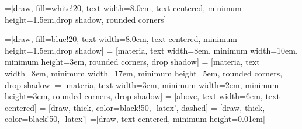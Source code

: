 =[draw, fill=white!20, text width=8.0em, text centered,
  minimum height=1.5em,drop shadow, rounded corners]

=[draw, fill=blue!20, text width=8.0em, text centered,
  minimum height=1.5em,drop shadow]
 = [materia, text width=8em, minimum width=10em,
  minimum height=3em, rounded corners, drop shadow]
 = [materia, text width=8em, minimum width=17em,
  minimum height=5em, rounded corners, drop shadow]
 = [materia, text width=3em, minimum width=2em, 
  minimum height=3em, rounded corners, drop shadow]
 = [above, text width=6em, text centered]
 = [draw, thick, color=black!50, -latex', dashed]
 = [draw, thick, color=black!50, -latex']
=[draw, text centered, minimum height=0.01em]
 
\newcommand{\blockdist}{1.3}
\newcommand{\edgedist}{1.5}

\newcommand{\block}[2]{node (p#1) [blockStyle]
  {{\scriptsize{#2}}}}
  
\newcommand{\oldblock}[2]{node (p#1) [oldblockStyle]
  {{\scriptsize{#2}}}}
  
\newcommand{\blockInserted}[2]{node (p#1) [codeInserted]
  {{\scriptsize{#2}}}}
  
\newcommand{\smallbBock}[2]{node (p#1) [smallblockStyle]
  {{\scriptsize{#2}}}}
  
\newcommand{\sharedHeap}[2]{node (p#1) [draw, fill=blue!20, text width=6.0em, text centered, minimum height=2.5em, rounded corners]
  {{\scriptsize{#2}}}}

\newcommand{\kaffeProcess}[2]{node (p#1) [draw, fill=blue!20, text width=3.0em, text centered, minimum height=7em, rounded corners]
  {{\scriptsize{#2}}}}
  
